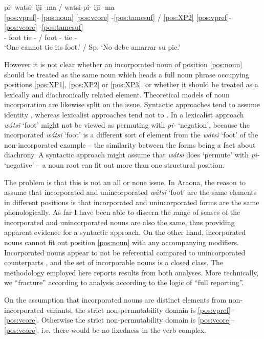 \documentclass[output=paper,hidelinks]{langscibook}
\begin{document}
\ea \label{ex:piwatsiiji}
    \glll pi- watsi- iji -ma / watsi pi- iji -ma  \\
	\ref{pos:vpref}- \ref{pos:noun} \ref{pos:vcore} -\ref{pos:tamesuf} / \ref{pos:XP2} \ref{pos:vpref}- \ref{pos:vcore} -\ref{pos:tamesuf} 	\\
	\Neg{}- foot tie -\Neg{} / foot \Neg{}- tie -\Neg{} \\
	\glt `One cannot tie its foot.' / Sp. `No debe amarrar su pie.'
\z

However it is not clear whether an incorporated noun of position \ref{pos:noun} should be treated as the same noun which heads a full noun phrase occupying positions \ref{pos:XP1}, \ref{pos:XP2} or \ref{pos:XP3}, or whether it should be treated as a lexically and diachronically related element. Theoretical models of noun incorporation are likewise split on the issue. Syntactic approaches tend to assume identity \citep{Baker1988, sadock1991autolexical}, whereas lexicalist approaches tend not to \citep{rosen1989two, Anderson2005}. In a lexicalist approach \textit{wátsi} `foot' might not be viewed as permuting with \textit{pi-} `negation', because the incorporated \textit{wátsi} `foot' is a different sort of element from the \textit{wátsi} `foot' of the non-incorporated example -- the similarity between the forms being a fact about diachrony. A syntactic approach might assume that \textit{wátsi} does `permute' with \textit{pi-} `negative' -- a noun root can fit out more than one structural position.

The problem is that this is not an all or none issue. In Araona, the reason to assume that incorporated and unincorporated \textit{wátsi} `foot' are the same elements in different positions is that incorporated and unincorporated forms are the same phonologically. As far I have been able to discern the range of senses of the incorporated and unincorporated nouns are also the same, thus providing apparent evidence for a syntactic approach. On the other hand, incorporated nouns cannot fit out position \ref{pos:noun} with any accompanying modifiers. Incorporated nouns appear to not be referential compared to unincorporated counterparts \citep{tallman2022body}, and the set of incorporable nouns is a closed class. The methodology employed here reports results from both analyses. More technically, we ``fracture'' according to analysis according to the logic of ``full reporting''.

On the assumption that incorporated nouns are distinct elements from non-incorporated variants, the strict non-permutability domain is \ref{pos:vpref}--\ref{pos:vcore}. Otherwise the strict non-permutability domain is \ref{pos:vcore}--\ref{pos:vcore}, i.e. there would be no fixedness in the verb complex.
\end{document}
